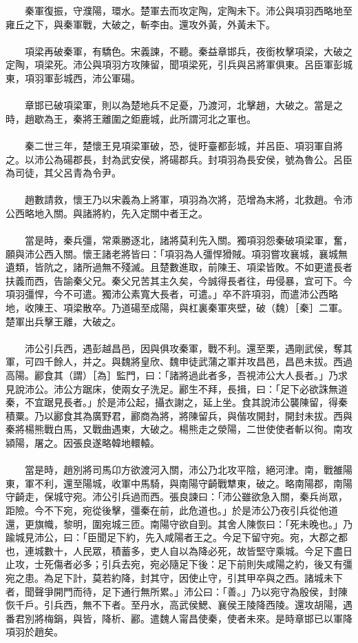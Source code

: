 　　秦軍復振，守濮陽，環水。楚軍去而攻定陶，定陶未下。沛公與項羽西略地至雍丘之下，與秦軍戰，大破之，斬李由。還攻外黃，外黃未下。
\\\\
　　項梁再破秦軍，有驕色。宋義諫，不聽。秦益章邯兵，夜銜枚擊項梁，大破之定陶，項梁死。沛公與項羽方攻陳留，聞項梁死，引兵與呂將軍俱東。呂臣軍彭城東，項羽軍彭城西，沛公軍碭。
\\\\
　　章邯已破項梁軍，則以為楚地兵不足憂，乃渡河，北擊趙，大破之。當是之時，趙歇為王，秦將王離圍之鉅鹿城，此所謂河北之軍也。
\\\\
　　秦二世三年，楚懷王見項梁軍破，恐，徙盱臺都彭城，并呂臣、項羽軍自將之。以沛公為碭郡長，封為武安侯，將碭郡兵。封項羽為長安侯，號為魯公。呂臣為司徒，其父呂青為令尹。
\\\\
　　趙數請救，懷王乃以宋義為上將軍，項羽為次將，范增為末將，北救趙。令沛公西略地入關。與諸將約，先入定關中者王之。
\\\\
　　當是時，秦兵彊，常乘勝逐北，諸將莫利先入關。獨項羽怨秦破項梁軍，奮，願與沛公西入關。懷王諸老將皆曰：「項羽為人彊悍猾賊。項羽嘗攻襄城，襄城無遺類，皆阬之，諸所過無不殘滅。且楚數進取，前陳王、項梁皆敗。不如更遣長者扶義而西，告諭秦父兄。秦父兄苦其主久矣，今誠得長者往，毋侵暴，宜可下。今項羽彊悍，今不可遣。獨沛公素寬大長者，可遣。」卒不許項羽，而遣沛公西略地，收陳王、項梁散卒。乃道碭至成陽，與杠裏秦軍夾壁，破（魏）［秦］二軍。楚軍出兵擊王離，大破之。
\\\\
　　沛公引兵西，遇彭越昌邑，因與俱攻秦軍，戰不利。還至栗，遇剛武侯，奪其軍，可四千餘人，并之。與魏將皇欣、魏申徒武蒲之軍并攻昌邑，昌邑未拔。西過高陽。酈食其（謂）［為］監門，曰：「諸將過此者多，吾視沛公大人長者。」乃求見說沛公。沛公方踞床，使兩女子洗足。酈生不拜，長揖，曰：「足下必欲誅無道秦，不宜踞見長者。」於是沛公起，攝衣謝之，延上坐。食其說沛公襲陳留，得秦積粟。乃以酈食其為廣野君，酈商為將，將陳留兵，與偕攻開封，開封未拔。西與秦將楊熊戰白馬，又戰曲遇東，大破之。楊熊走之滎陽，二世使使者斬以徇。南攻潁陽，屠之。因張良遂略韓地轘轅。
\\\\
　　當是時，趙別將司馬卬方欲渡河入關，沛公乃北攻平陰，絕河津。南，戰雒陽東，軍不利，還至陽城，收軍中馬騎，與南陽守齮戰犨東，破之。略南陽郡，南陽守齮走，保城守宛。沛公引兵過而西。張良諫曰：「沛公雖欲急入關，秦兵尚眾，距險。今不下宛，宛從後擊，彊秦在前，此危道也。」於是沛公乃夜引兵從他道還，更旗幟，黎明，圍宛城三匝。南陽守欲自剄。其舍人陳恢曰：「死未晚也。」乃踰城見沛公，曰：「臣聞足下約，先入咸陽者王之。今足下留守宛。宛，大郡之都也，連城數十，人民眾，積蓄多，吏人自以為降必死，故皆堅守乘城。今足下盡日止攻，士死傷者必多；引兵去宛，宛必隨足下後：足下前則失咸陽之約，後又有彊宛之患。為足下計，莫若約降，封其守，因使止守，引其甲卒與之西。諸城未下者，聞聲爭開門而待，足下通行無所累。」沛公曰：「善。」乃以宛守為殷侯，封陳恢千戶。引兵西，無不下者。至丹水，高武侯鰓、襄侯王陵降西陵。還攻胡陽，遇番君別將梅鋗，與皆，降析、酈。遣魏人甯昌使秦，使者未來。是時章邯已以軍降項羽於趙矣。
